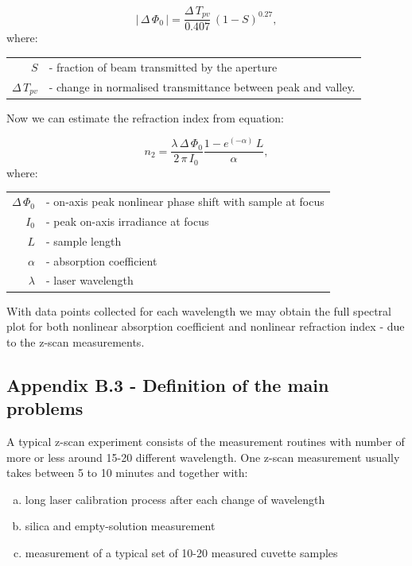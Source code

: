 \documentclass[12pt,twoside,a4paper]{article}
\numberwithin{equation}{subsection}
\numberwithin{figure}{subsection}
\begin{document}
\begin{equation} \label{eq:nlo_onaxisshift}
  \left| \! \,\Delta \,{\Phi_{0}}\, \!  \right| =\frac {\Delta \,{T_{pv}}}{0.407}\,(1 - S)^{0.27},
\end{equation}
where: 
\begin{tabular}{ r l}
  $S$ & - fraction of beam transmitted by the aperture \\
  $\Delta \,{T_{pv}}$ & - change in normalised transmittance between peak and valley. \\ 
\end{tabular}

Now we can estimate the refraction index from equation:

\begin{equation} \label{eq:nlo_estrefindex}
  {n_{2}}=\frac {\lambda \,\Delta \,{\Phi_{0}}}{2\,\pi \,{I_{0}}\,}\frac {1 - e^{( - \alpha )}\,L}{\alpha },
\end{equation}
where: 
\begin{tabular}{ r l}
  $\Delta \,{\Phi_{0}}$ & - on-axis peak nonlinear phase shift with sample at focus \\
  ${I_{0}}$  & - peak on-axis irradiance at focus \\
  $L$ & - sample length \\
  $\alpha $ & - absorption coefficient \\
  $\lambda $  & - laser wavelength \\
\end{tabular}

With data points collected for each wavelength we may obtain the full spectral plot for both nonlinear absorption coefficient and nonlinear refraction index - due to the z-scan measurements.

\subsection*{Appendix B.3 - Definition of the main problems} \label{chap:zscan_problems}

A typical z-scan experiment consists of the measurement routines with number of more or less around 15-20 different wavelength. One z-scan measurement usually takes between 5 to 10 minutes and together with:
\begin{enumerate}[(a)]
  \item long laser calibration process after each change of wavelength
  \item silica and empty-solution measurement
  \item measurement of a typical set of 10-20 measured cuvette samples 
\end{enumerate}
\end{document}
